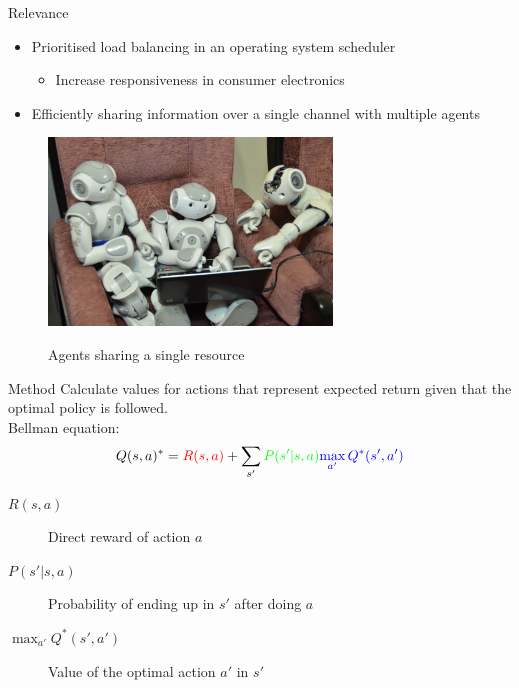 \documentclass{beamer}
\begin{document}
\begin{frame}{Relevance}
	\begin{itemize}
		\item Prioritised load balancing in an operating system scheduler
		\begin{itemize}
			\item Increase responsiveness in consumer electronics
		\end{itemize}
		\item Efficiently sharing information over a single channel with multiple
			agents
	\end{itemize}
	\begin{figure}
		\caption{Agents sharing a single resource}
		\includegraphics[height=5cm]{naos_pc}
	   \label{fig:naos_pc}
	\end{figure}
\end{frame}


\begin{frame}{Method}
	Calculate values for actions that represent expected return given that the
	optimal policy is followed.\\
	Bellman equation:
	$$ \displaystyle
	Q(s, a)^* = {\color{red}R(s, a)} + \sum_{s'} {\color{green}P(s'|s, a)}
	{\color{blue}\max_{a'} Q^*(s', a')}
	$$
	\begin{description}
		\item[{\color{red}$R(s, a)$}] Direct reward of action $a$
		\item[{\color{green}$P(s'|s, a)$}] Probability of ending up in $s'$ after doing $a$
		\item[{\color{blue}$\max_{a'} Q^*(s', a')$}] Value of the optimal action $a'$ in $s'$
	\end{description}
\end{frame}
\end{document}
